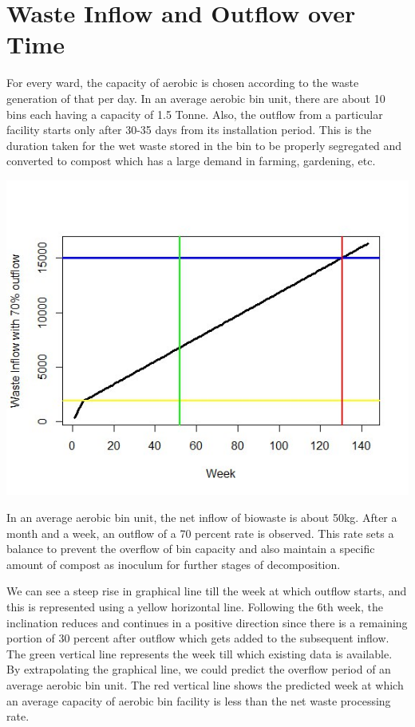 \documentclass[12pt,a4paper]{report}
\begin{document}
\section{Waste Inflow and Outflow over Time}
\begin{justify}
	For every ward, the capacity of aerobic is chosen according to the waste generation of that per day. In an average aerobic bin unit, there are about 10 bins each having a capacity of 1.5 Tonne. Also, the outflow from a particular facility starts only after 30-35 days from its installation period. This is the duration taken for the wet waste stored in the bin to be properly segregated and converted to compost which has a large demand in farming, gardening, etc.
	
	\includegraphics[width=1\textwidth]{wio}
	
	In an average aerobic bin unit, the net inflow of biowaste is about 50kg. After a month and a week, an outflow of a 70 percent rate is observed. This rate sets a balance to prevent the overflow of bin capacity and also maintain a specific amount of compost as inoculum for further stages of decomposition. 
	
	We can see a steep rise in graphical line till the week at which outflow starts, and this is represented using a yellow horizontal line. Following the 6th week, the inclination reduces and continues in a  positive direction since there is a remaining portion of 30 percent after outflow which gets added to the subsequent inflow. The green vertical line represents the week till which existing data is available. By extrapolating the graphical line, we could predict the overflow period of an average aerobic bin unit. The red vertical line shows the predicted week at which an average capacity of aerobic bin facility is less than the net waste processing rate. 
	
\end{justify}
\end{document}
